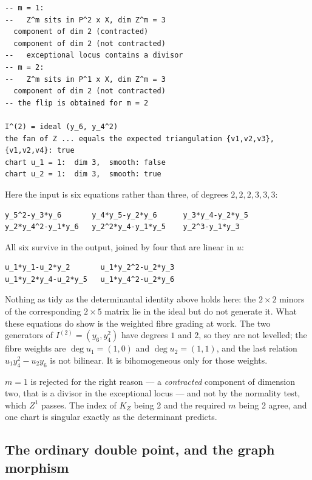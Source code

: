 \documentclass[11pt,reqno]{amsart}
\theoremstyle{plain}
\theoremstyle{definition}
\begin{document}
\begin{verbatim}
-- m = 1:
--   Z^m sits in P^2 x X, dim Z^m = 3
  component of dim 2 (contracted)
  component of dim 2 (not contracted)
--   exceptional locus contains a divisor
-- m = 2:
--   Z^m sits in P^1 x X, dim Z^m = 3
  component of dim 2 (not contracted)
-- the flip is obtained for m = 2

I^(2) = ideal (y_6, y_4^2)
the fan of Z ... equals the expected triangulation {v1,v2,v3}, {v1,v2,v4}: true
chart u_1 = 1:  dim 3,  smooth: false
chart u_2 = 1:  dim 3,  smooth: true
\end{verbatim}

Here the input is six equations rather than three, of degrees
\(2,2,2,3,3,3\):

\begin{verbatim}
y_5^2-y_3*y_6       y_4*y_5-y_2*y_6      y_3*y_4-y_2*y_5
y_2*y_4^2-y_1*y_6   y_2^2*y_4-y_1*y_5    y_2^3-y_1*y_3
\end{verbatim}

\noindent
All six survive in the output, joined by four that are linear in \(u\):

\begin{verbatim}
u_1*y_1-u_2*y_2       u_1*y_2^2-u_2*y_3
u_1*y_2*y_4-u_2*y_5   u_1*y_4^2-u_2*y_6
\end{verbatim}

\noindent
Nothing as tidy as the determinantal identity above holds here: the
\(2 \times 2\) minors of the corresponding \(2 \times 5\) matrix lie in
the ideal but do not generate it. What these equations do show is the
weighted fibre grading at work. The two generators of
\(I^{(2)} = (y_6, y_4^2)\) have degrees \(1\) and \(2\), so they are not
levelled; the fibre weights are \(\deg u_1 = (1,0)\) and
\(\deg u_2 = (1,1)\), and the last relation \(u_1 y_4^2 - u_2 y_6\) is
not bilinear. It is bihomogeneous only for those weights.

\(m = 1\) is rejected for the right reason --- a \emph{contracted}
component of dimension two, that is a divisor in the exceptional locus
--- and not by the normality test, which \(Z^1\) passes. The index of
\(K_Z\) being 2 and the required \(m\) being 2 agree, and one chart is
singular exactly as the determinant predicts.

\subsection{The ordinary double point, and the graph
morphism}\label{the-ordinary-double-point-and-the-graph-morphism}
\end{document}
